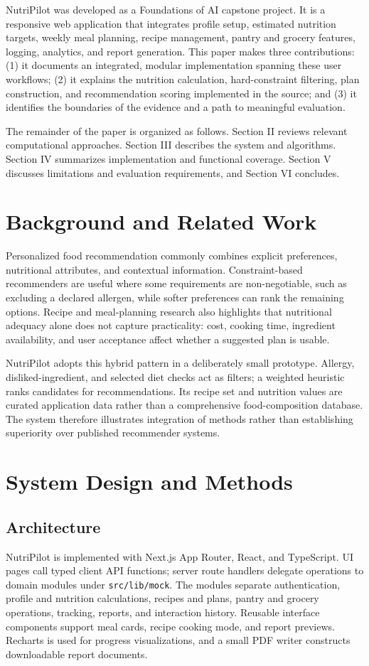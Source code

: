 \documentclass[10pt,twocolumn]{article}
\begin{document}
NutriPilot was developed as a Foundations of AI capstone project. It is a responsive web application that integrates profile setup, estimated nutrition targets, weekly meal planning, recipe management, pantry and grocery features, logging, analytics, and report generation. This paper makes three contributions: (1) it documents an integrated, modular implementation spanning these user workflows; (2) it explains the nutrition calculation, hard-constraint filtering, plan construction, and recommendation scoring implemented in the source; and (3) it identifies the boundaries of the evidence and a path to meaningful evaluation.

The remainder of the paper is organized as follows. Section II reviews relevant computational approaches. Section III describes the system and algorithms. Section IV summarizes implementation and functional coverage. Section V discusses limitations and evaluation requirements, and Section VI concludes.

\section{Background and Related Work}
Personalized food recommendation commonly combines explicit preferences, nutritional attributes, and contextual information. Constraint-based recommenders are useful where some requirements are non-negotiable, such as excluding a declared allergen, while softer preferences can rank the remaining options. Recipe and meal-planning research also highlights that nutritional adequacy alone does not capture practicality: cost, cooking time, ingredient availability, and user acceptance affect whether a suggested plan is usable.

NutriPilot adopts this hybrid pattern in a deliberately small prototype. Allergy, disliked-ingredient, and selected diet checks act as filters; a weighted heuristic ranks candidates for recommendations. Its recipe set and nutrition values are curated application data rather than a comprehensive food-composition database. The system therefore illustrates integration of methods rather than establishing superiority over published recommender systems.

\section{System Design and Methods}
\subsection{Architecture}
NutriPilot is implemented with Next.js App Router, React, and TypeScript. UI pages call typed client API functions; server route handlers delegate operations to domain modules under \texttt{src/lib/mock}. The modules separate authentication, profile and nutrition calculations, recipes and plans, pantry and grocery operations, tracking, reports, and interaction history. Reusable interface components support meal cards, recipe cooking mode, and report previews. Recharts is used for progress visualizations, and a small PDF writer constructs downloadable report documents.
\end{document}
